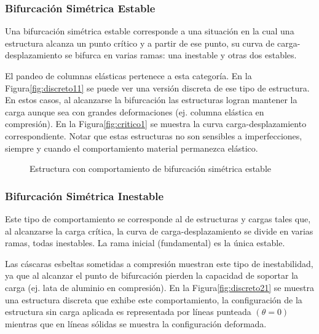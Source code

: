 \subsubsection{Bifurcación Simétrica Estable}

Una bifurcación simétrica estable corresponde a una situación en la cual una estructura alcanza un punto crítico y a partir de ese punto, su curva de carga-desplazamiento se bifurca en varias ramas: una inestable y otras dos estables.

El pandeo de columnas elásticas pertenece a esta categoría. En la Figura\autoref{fig:discreto11} se puede ver una versión discreta de ese tipo de estructura. En estos casos, al alcanzarse la bifurcación las estructuras logran mantener la carga aunque sea con grandes deformaciones (ej. columna elástica en compresión). En la Figura\autoref{fig:critico1} se muestra la curva carga-desplazamiento correspondiente. Notar que estas estructuras no son sensibles a imperfecciones, siempre y cuando el comportamiento material permanezca elástico.
\begin{figure}[htb]
	\centering
{}
\hspace{1em}
\caption{Estructura con comportamiento de bifurcación simétrica estable}
	\label{fig:simetrica1}
\end{figure}

\subsubsection{Bifurcación Simétrica Inestable}

Este tipo de comportamiento se corresponde al de estructuras y cargas tales que, al alcanzarse la carga crítica, la curva de carga-desplazamiento se divide en varias ramas, todas inestables. La rama inicial (fundamental) es la única estable.

Las cáscaras esbeltas sometidas a compresión muestran este tipo de inestabilidad, ya que al alcanzar el punto de bifurcación pierden la capacidad de soportar la carga (ej. lata de aluminio en compresión). En la Figura\autoref{fig:discreto21} se muestra una estructura discreta que exhibe este comportamiento, la configuración de la estructura sin carga aplicada es representada por líneas punteada $(\theta = 0)$ mientras que en líneas sólidas se muestra la configuración deformada.

